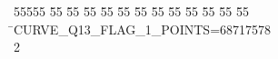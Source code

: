 %
%
\begin{tabbing}
55555 \= 55 \= 55 \= 55 \= 55 \= 55 \= 55 \= 55 \= 55 \= 55 \= 55 \= 55 \= 55 \= \>CURVE\_Q13\_FLAG\_1\_POINTS=68717578\\[0pt]
2\>\end{tabbing}
